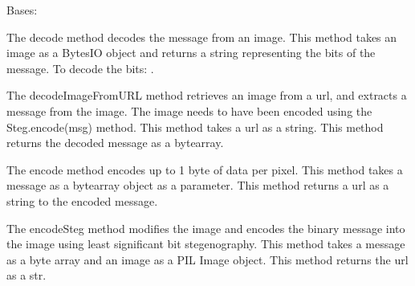\documentclass[letterpaper,10pt,english]{sphinxmanual}
\begin{document}
\begin{fulllineitems}
\label{Image_Manipulation:Image_Manipulation.lsbsteg.Steg}
Bases: 

\begin{fulllineitems}
\label{Image_Manipulation:Image_Manipulation.lsbsteg.Steg.decode}
The decode method decodes the message from an image.
This method takes an image as a BytesIO object and returns a string
representing the bits of the message. To decode the bits:
.

\end{fulllineitems}


\begin{fulllineitems}
\label{Image_Manipulation:Image_Manipulation.lsbsteg.Steg.decodeImageFromURL}
The decodeImageFromURL method retrieves an image from a url,
and extracts a message from the image. The image needs to have
been encoded using the Steg.encode(msg) method.
This method takes a url as a string.
This method returns the decoded message as a bytearray.

\end{fulllineitems}


\begin{fulllineitems}
\label{Image_Manipulation:Image_Manipulation.lsbsteg.Steg.encode}
The encode method encodes up to 1 byte of data per pixel.
This method takes a message as a bytearray object as a parameter.
This method returns a url as a string to the encoded message.

\end{fulllineitems}


\begin{fulllineitems}
\label{Image_Manipulation:Image_Manipulation.lsbsteg.Steg.encodeSteg}
The encodeSteg method modifies the image and encodes the binary
message into the image using least significant bit stegenography.
This method takes a message as a byte array and an image as a
PIL Image object.
This method returns the url as a str.

\end{fulllineitems}


\end{fulllineitems}
\end{document}
